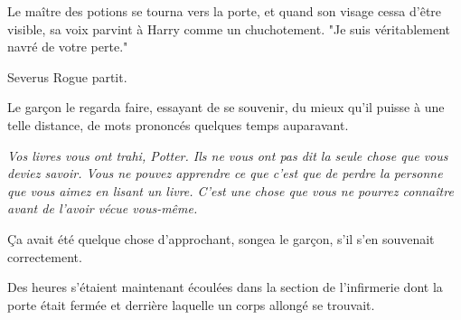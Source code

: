 Le maître des potions se tourna vers la porte, et quand son visage cessa d'être visible, sa voix parvint à Harry comme un chuchotement. "Je suis véritablement navré de votre perte."

Severus Rogue partit.

Le garçon le regarda faire, essayant de se souvenir, du mieux qu'il puisse à une telle distance, de mots prononcés quelques temps auparavant.

\emph{Vos livres vous ont trahi, Potter. Ils ne vous ont pas dit la seule chose que vous deviez savoir. Vous ne pouvez apprendre ce que c'est que de perdre la personne que vous aimez en lisant un livre. C'est une chose que vous ne pourrez connaître avant de l'avoir vécue vous-même.}

Ça avait été quelque chose d'approchant, songea le garçon, s'il s'en souvenait correctement.

\later

Des heures s'étaient maintenant écoulées dans la section de l'infirmerie dont la porte était fermée et derrière laquelle un corps allongé se trouvait.

